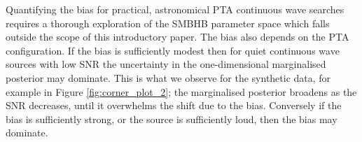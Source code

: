 \documentclass[fleqn,usenatbib,useAMS]{mnras}
\begin{document}
Quantifying the bias for practical, astronomical PTA continuous wave searches requires a thorough exploration of the SMBHB parameter space which falls outside the scope of this introductory paper. The bias also depends on the PTA configuration. If the bias is sufficiently modest then for quiet continuous wave sources with low SNR the uncertainty in the one-dimensional marginalised posterior may dominate. This is what we observe for the synthetic data, for example in Figure \ref{fig:corner_plot_2}; the marginalised posterior broadens as the SNR decreases, until it overwhelms the shift due to the bias. Conversely if the bias is sufficiently strong, or the source is sufficiently loud, then the bias may dominate. \newline  




\end{document}
